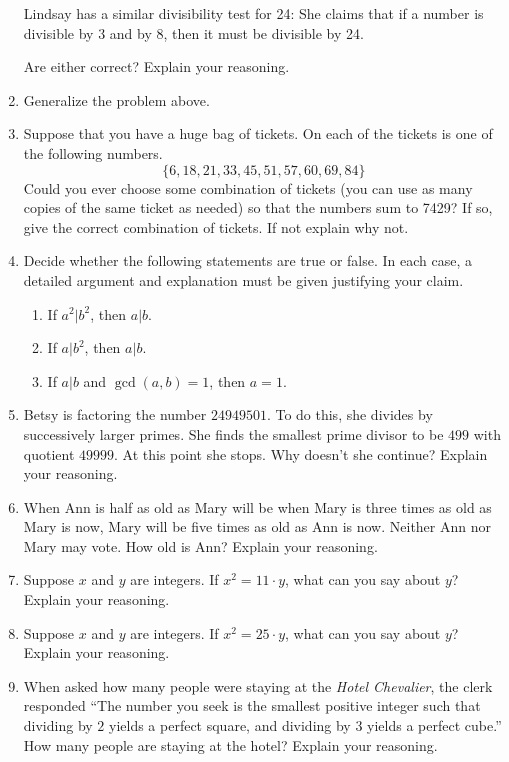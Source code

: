 \begin{problems}
\begin{enumerate}
Lindsay has a similar divisibility test for 24: She claims that if a
number is divisible by 3 and by 8, then it must be divisible by 24.

Are either correct?  Explain your reasoning.
\item Generalize the problem above.
\item Suppose that you have a huge bag of tickets. On each of the
  tickets is one of the following numbers. 
\[
\{6, 18, 21, 33, 45, 51, 57, 60, 69, 84\}
\]
Could you ever choose some combination of tickets (you can use as many
copies of the same ticket as needed) so that the numbers sum to 7429?
If so, give the correct combination of tickets. If not explain why
not.
\item\label{P:helper} Decide whether the following statements are true
  or false. In each case, a detailed argument and explanation must be
  given justifying your claim.
\begin{enumerate}
\item If $a^2|b^2$, then $a|b$.
\item If $a|b^2$, then $a|b$.
\item If $a|b$ and $\gcd(a,b) = 1$, then $a = 1$.
\end{enumerate}
\item Betsy is factoring the number $24949501$. To do this, she
  divides by successively larger primes. She finds the smallest prime
  divisor to be $499$ with quotient $49999$. At this point she
  stops. Why doesn't she continue? Explain your reasoning.
\item When Ann is half as old as Mary will be when Mary is three times
  as old as Mary is now, Mary will be five times as old as Ann is
  now. Neither Ann nor Mary may vote. How old is Ann? Explain your
  reasoning.
\item Suppose $x$ and $y$ are integers.  If $x^2 = 11\cdot y$, what can you say about $y$? Explain your
  reasoning.
\item Suppose $x$ and $y$ are integers.  If $x^2 = 25\cdot y$, what can you say about $y$? Explain your
  reasoning.
\item When asked how many people were staying at the \textit{Hotel
  Chevalier}, the clerk responded ``The number you seek is the
  smallest positive integer such that dividing by $2$ yields a perfect
  square, and dividing by $3$ yields a perfect cube.'' How many people
  are staying at the hotel? Explain your reasoning.
\end{enumerate}
\end{problems}

